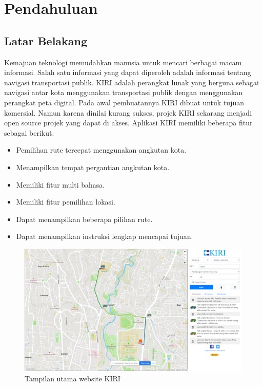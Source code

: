 \chapter{Pendahuluan}
\label{chap:intro}
   
\section{Latar Belakang}
\label{sec:label}

Kemajuan teknologi memudahkan manusia untuk mencari berbagai macam informasi. Salah satu informasi yang dapat diperoleh adalah informasi tentang navigasi transportasi publik. KIRI  adalah perangkat lunak yang berguna sebagai navigasi antar kota menggunakan transportasi publik dengan menggunakan perangkat peta digital\cite{pascal:17:KIRI}. Pada awal pembuatannya KIRI dibuat untuk tujuan komersial. Namun karena dinilai kurang sukses, projek KIRI sekarang menjadi open source projek yang dapat di akses. Aplikasi KIRI memiliki beberapa fitur sebagai berikut:
\begin{itemize}
	\item Pemilihan rute tercepat menggunakan angkutan kota.
	\item Menampilkan tempat pergantian angkutan kota.
	\item Memiliki fitur multi bahasa.
	\item Memiliki fitur pemilihan lokasi.
	\item Dapat menampilkan beberapa pilihan rute.
	\item Dapat menampilkan instruksi lengkap  mencapai tujuan.
\end{itemize}

\begin{figure}[H]
	\centering
	\includegraphics[scale=0.3]{Gambar/kiri-example-1}
	\caption{Tampilan utama website KIRI}
	\label{fig:my_label}
\end{figure}



